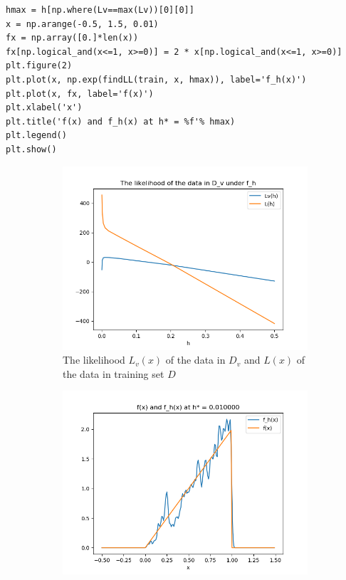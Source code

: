 \documentclass[preprint,12pt]{elsarticle}
\begin{document}
\begin{enumerate}[label=\alph*]
\begin{lstlisting}
hmax = h[np.where(Lv==max(Lv))[0][0]]
x = np.arange(-0.5, 1.5, 0.01)
fx = np.array([0.]*len(x))
fx[np.logical_and(x<=1, x>=0)] = 2 * x[np.logical_and(x<=1, x>=0)]
plt.figure(2)
plt.plot(x, np.exp(findLL(train, x, hmax)), label='f_h(x)')
plt.plot(x, fx, label='f(x)')
plt.xlabel('x')
plt.title('f(x) and f_h(x) at h* = %f'% hmax)
plt.legend()
plt.show()
        \end{lstlisting}
        \begin{figure}[htbp!]
            \center
            \begin{subfigure}{0.8\textwidth}
                \includegraphics[width = \textwidth]{6.png}
                \caption{The likelihood $L_v(x)$ of the data in $D_v$ and 
                $L(x)$ of the data in training set $D$}
                \label{fig:41}
            \end{subfigure}
            \begin{subfigure}{0.8\textwidth}
                \includegraphics[width = \textwidth]{7.png}

\end{subfigure}
\end{figure}
\end{enumerate}
\end{document}
